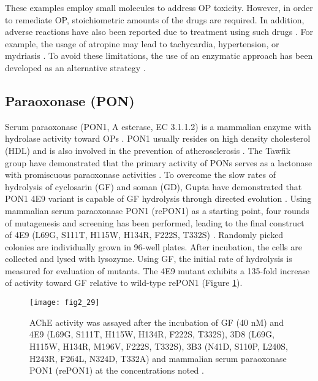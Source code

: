 \begin{refsection}
These examples employ small molecules to address OP toxicity. However, in order to
remediate OP, stoichiometric amounts of the drugs are required. In addition,
adverse reactions have also been reported due to treatment using such drugs
\cite{Robenshtok2002,MahdiBalaliMood2012a}. For example, the usage of atropine
may lead to tachycardia, hypertension, or mydriasis \cite{Robenshtok2002}.  To
avoid these limitations, the use of an enzymatic approach has been developed as
an alternative strategy
\cite{Tsai2010a,Cherny2013,Chen-Goodspeed2001a,Rochu2002b,Grimsley1997b,Roodveldt2005,Griffiths2003c}.

\subsection{Paraoxonase (PON)}

Serum paraoxonase (PON1, A esterase, EC 3.1.1.2) is a mammalian enzyme with
hydrolase activity toward OPs \cite{Khersonsky2005}. PON1 usually resides on
high density cholesterol (HDL) and is also involved in the prevention of
atherosclerosis \cite{Khersonsky2005}. The Tawfik group have demonstrated that the
primary activity of PONs serves as a lactonase with promiscuous paraoxonase
activities \cite{Khersonsky2005,Gupta2011}. To overcome the slow rates of
hydrolysis of cyclosarin (GF) and soman (GD), Gupta  have demonstrated
that PON1 4E9 variant is capable of GF hydrolysis through directed evolution
\cite{Gupta2011}. Using mammalian serum paraoxonase PON1 (rePON1) as a starting point,
four rounds of mutagenesis and screening has been performed, leading to the final
construct of 4E9 (L69G, S111T, H115W, H134R, F222S, T332S) \cite{Gupta2011}.
Randomly picked colonies are individually grown in 96-well plates. After
incubation, the cells are collected and lysed with lysozyme. Using GF, the
initial rate of hydrolysis is measured for evaluation of mutants.  The 4E9
mutant exhibits a 135-fold increase of activity toward GF relative to
wild-type rePON1 (Figure \ref{fig:paraoxonase}).
\begin{figure}[htbp] \centering \texttt{[image: fig2\_29]}
    \caption[AChE activity was assayed after the incubation of GF (40 nM) and
    4E9 (L69G, S111T, H115W, H134R, F222S, T332S), 3D8 (L69G, H115W, H134R,
    M196V, F222S, T332S), 3B3 (N41D, S110P, L240S, H243R, F264L, N324D, T332A)
    and  mammalian serum paraoxonase PON1 (rePON1) at the concentrations
noted.]{AChE activity was assayed after the incubation of GF (40 nM) and 4E9
    (L69G, S111T, H115W, H134R, F222S, T332S), 3D8 (L69G, H115W, H134R, M196V,
    F222S, T332S), 3B3 (N41D, S110P, L240S, H243R, F264L, N324D, T332A) and
    mammalian serum paraoxonase PON1 (rePON1) at the concentrations noted
    \cite{Gupta2011}.} \label{fig:paraoxonase}
\end{figure}


\end{refsection}
